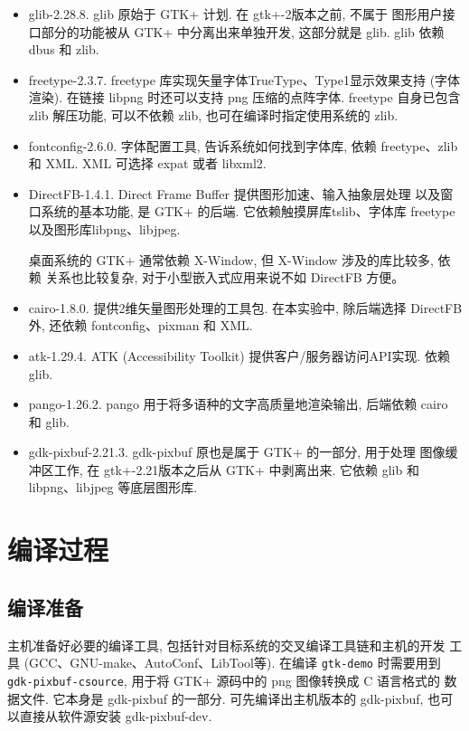 \begin{itemize}
    \item glib-2.28.8. glib 原始于 GTK+ 计划. 在 gtk+-2版本之前, 不属于
        图形用户接口部分的功能被从 GTK+ 中分离出来单独开发, 这部分就是 glib.
        glib 依赖 dbus 和 zlib.

    \item freetype-2.3.7. freetype 库实现矢量字体TrueType、Type1显示效果支持
        (字体渲染). 在链接 libpng 时还可以支持 png 压缩的点阵字体. freetype
        自身已包含 zlib 解压功能, 可以不依赖 zlib, 也可在编译时指定使用系统的
        zlib.

    \item fontconfig-2.6.0. 字体配置工具, 告诉系统如何找到字体库, 依赖
        freetype、zlib 和 XML. XML 可选择 expat 或者 libxml2.

    \item DirectFB-1.4.1. Direct Frame Buffer 提供图形加速、输入抽象层处理
        以及窗口系统的基本功能, 是 GTK+ 的后端. 它依赖触摸屏库tslib、字体库
        freetype 以及图形库libpng、libjpeg.

        桌面系统的 GTK+ 通常依赖 X-Window, 但 X-Window 涉及的库比较多, 依赖
        关系也比较复杂, 对于小型嵌入式应用来说不如 DirectFB 方便。

    \item cairo-1.8.0. 提供2维矢量图形处理的工具包. 在本实验中, 除后端选择
        DirectFB外, 还依赖 fontconfig、pixman 和 XML.

    \item atk-1.29.4. ATK (Accessibility Toolkit) 提供客户/服务器访问API实现.
        依赖 glib.

    \item pango-1.26.2. pango 用于将多语种的文字高质量地渲染输出, 后端依赖
        cairo 和 glib.

    \item gdk-pixbuf-2.21.3. gdk-pixbuf 原也是属于 GTK+ 的一部分, 用于处理
        图像缓冲区工作, 在 gtk+-2.21版本之后从 GTK+ 中剥离出来. 它依赖
        glib 和 libpng、libjpeg 等底层图形库.
\end{itemize}

\section{编译过程}
\subsection{编译准备}
主机准备好必要的编译工具, 包括针对目标系统的交叉编译工具链和主机的开发
工具 (GCC、GNU-make、AutoConf、LibTool等). 在编译 \verb|gtk-demo| 时需要用到
\verb|gdk-pixbuf-csource|, 用于将 GTK+ 源码中的 png 图像转换成 C 语言格式的
数据文件. 它本身是 gdk-pixbuf 的一部分. 可先编译出主机版本的 gdk-pixbuf,
也可以直接从软件源安装 gdk-pixbuf-dev.

